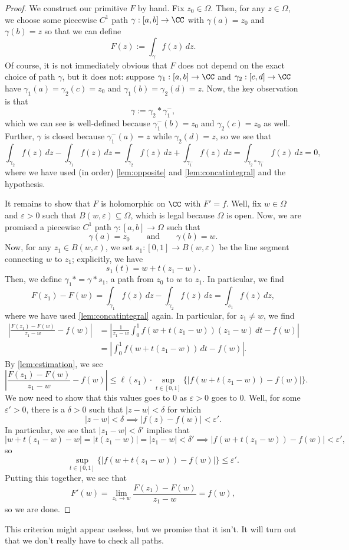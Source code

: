 \begin{proof}
	We construct our primitive $F$ by hand. Fix $z_0\in\Omega$. Then, for any $z\in\Omega$, we choose some piecewise $C^1$ path $\gamma:[a,b]\to\CC$ with $\gamma(a)=z_0$ and $\gamma(b)=z$ so that we can define
	\[F(z):=\int_\gamma f(z)\,dz.\]
	Of course, it is not immediately obvious that $F$ does not depend on the exact choice of path $\gamma$, but it does not: suppose $\gamma_1:[a,b]\to\CC$ and $\gamma_2:[c,d]\to\CC$ have $\gamma_1(a)=\gamma_2(c)=z_0$ and $\gamma_1(b)=\gamma_2(d)=z$. Now, the key observation is that
	\[\gamma:=\gamma_2*\gamma_1^-,\]
	which we can see is well-defined because $\gamma_1^-(b)=z_0$ and $\gamma_2(c)=z_0$ as well. Further, $\gamma$ is closed because $\gamma_1^-(a)=z$ while $\gamma_2(d)=z$, so we see that
	\[\int_{\gamma_2}f(z)\,dz-\int_{\gamma_1}f(z)\,dz=\int_{\gamma_2}f(z)\,dz+\int_{\gamma_1^-}f(z)\,dz=\int_{\gamma_2*\gamma_1^-}f(z)\,dz=0,\]
	where we have used (in order) \autoref{lem:opposite} and \autoref{lem:concatintegral} and the hypothesis.

	It remains to show that $F$ is holomorphic on $\CC$ with $F'=f$. Well, fix $w\in\Omega$ and $\varepsilon>0$ such that $B(w,\varepsilon)\subseteq\Omega$, which is legal because $\Omega$ is open. Now, we are promised a piecewise $C^1$ path $\gamma:[a,b]\to\Omega$ such that
	\[\gamma(a)=z_0\qquad\text{and}\qquad\gamma(b)=w.\]
	Now, for any $z_1\in B(w,\varepsilon)$, we set $s_1:[0,1]\to B(w,\varepsilon)$ be the line segment connecting $w$ to $z_1$; explicitly, we have
	\[s_1(t)=w+t(z_1-w).\]
	Then, we define $\gamma_1*=\gamma*s_1$, a path from $z_0$ to $w$ to $z_1$. In particular, we find
	\[F(z_1)-F(w)=\int_{\gamma_1}f(z)\,dz-\int_{\gamma_2}f(z)\,dz=\int_{s_1}f(z)\,dz,\]
	where we have used \autoref{lem:concatintegral} again. In particular, for $z_1\ne w$, we find
	\begin{align*}
		\left|\frac{F(z_1)-F(w)}{z_1-w}-f(w)\right| &= \left|\frac1{z_1-w}\int_0^1f(w+t(z_1-w))(z_1-w)\,dt-f(w)\right| \\
		&= \left|\int_0^1f(w+t(z_1-w))\,dt-f(w)\right|.
	\end{align*}
	By \autoref{lem:estimation}, we see
	\[\left|\frac{F(z_1)-F(w)}{z_1-w}-f(w)\right|\le\ell(s_1)\cdot\sup_{t\in[0,1]}\{|f(w+t(z_1-w))-f(w)|\}.\]
	We now need to show that this values goes to $0$ as $\varepsilon>0$ goes to $0$. Well, for some $\varepsilon'>0$, there is a $\delta>0$ such that $|z-w|<\delta$ for which
	\[|z-w|<\delta\implies|f(z)-f(w)|<\varepsilon'.\]
	In particular, we see that $|z_1-w|<\delta'$ implies that
	\[|w+t(z_1-w)-w|=|t(z_1-w)|=|z_1-w|<\delta'\implies|f(w+t(z_1-w))-f(w)|<\varepsilon',\]
	so
	\[\sup_{t\in[0,1]}\{|f(w+t(z_1-w))-f(w)|\}\le\varepsilon'.\]
	Putting this together, we see that
	\[F'(w)=\lim_{z_1\to w}\frac{F(z_1)-F(w)}{z_1-w}=f(w),\]
	so we are done.
\end{proof}
\begin{remark}
	This criterion might appear useless, but we promise that it isn't. It will turn out that we don't really have to check all paths.
\end{remark}


